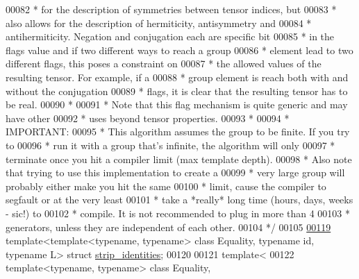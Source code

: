 \begin{DoxyCode}
00082 \textcolor{comment}{ * for the description of symmetries between tensor indices, but}
00083 \textcolor{comment}{ * also allows for the description of hermiticity, antisymmetry and}
00084 \textcolor{comment}{ * antihermiticity. Negation and conjugation each are specific bit}
00085 \textcolor{comment}{ * in the flags value and if two different ways to reach a group}
00086 \textcolor{comment}{ * element lead to two different flags, this poses a constraint on}
00087 \textcolor{comment}{ * the allowed values of the resulting tensor. For example, if a}
00088 \textcolor{comment}{ * group element is reach both with and without the conjugation}
00089 \textcolor{comment}{ * flags, it is clear that the resulting tensor has to be real.}
00090 \textcolor{comment}{ *}
00091 \textcolor{comment}{ * Note that this flag mechanism is quite generic and may have other}
00092 \textcolor{comment}{ * uses beyond tensor properties.}
00093 \textcolor{comment}{ *}
00094 \textcolor{comment}{ * IMPORTANT: }
00095 \textcolor{comment}{ *     This algorithm assumes the group to be finite. If you try to}
00096 \textcolor{comment}{ *     run it with a group that's infinite, the algorithm will only}
00097 \textcolor{comment}{ *     terminate once you hit a compiler limit (max template depth).}
00098 \textcolor{comment}{ *     Also note that trying to use this implementation to create a}
00099 \textcolor{comment}{ *     very large group will probably either make you hit the same}
00100 \textcolor{comment}{ *     limit, cause the compiler to segfault or at the very least}
00101 \textcolor{comment}{ *     take a *really* long time (hours, days, weeks - sic!) to}
00102 \textcolor{comment}{ *     compile. It is not recommended to plug in more than 4}
00103 \textcolor{comment}{ *     generators, unless they are independent of each other.}
00104 \textcolor{comment}{ */}
00105 
\hyperlink{struct_eigen_1_1internal_1_1group__theory_1_1strip__identities}{00119} \textcolor{keyword}{template}<\textcolor{keyword}{template}<\textcolor{keyword}{typename}, \textcolor{keyword}{typename}> \textcolor{keyword}{class }Equality, \textcolor{keyword}{typename} id, \textcolor{keyword}{typename} L> \textcolor{keyword}{struct }
      \hyperlink{struct_eigen_1_1internal_1_1group__theory_1_1strip__identities}{strip\_identities};
00120 
00121 \textcolor{keyword}{template}<
00122   \textcolor{keyword}{template}<\textcolor{keyword}{typename}, \textcolor{keyword}{typename}> \textcolor{keyword}{class }Equality,

\end{DoxyCode}
